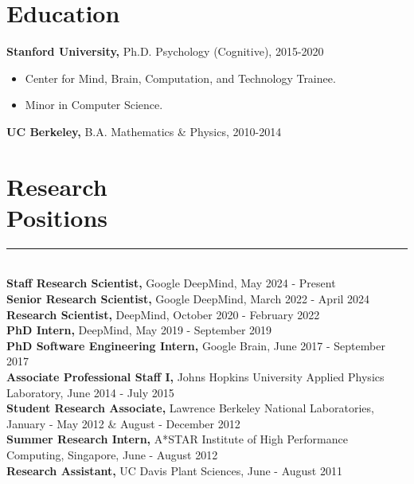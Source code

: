 \documentclass[margin]{res}
\begin{document}
 
 
 
\address{{\bf Email} \\ andrewlampinen@gmail.com}
\address{{\bf Website} \\\url{https://lampinen.github.io}}
\begin{resume} 
\section{Education} 
{\bf Stanford University,} Ph.D. Psychology (Cognitive), 2015-2020
\begin{itemize} \itemsep -2pt \item Center for Mind, Brain, Computation, and Technology Trainee. \item Minor in Computer Science.\end{itemize}
{\bf UC Berkeley,}  B.A. Mathematics \& Physics, 2010-2014%
\vspace{1pt}\section{Research\\Positions} \vspace{-15pt} \rule{\textwidth}{0.5pt} \\[3pt]
{\bf Staff Research Scientist,} Google DeepMind, May 2024 - Present\\[0.1em] 
{\bf Senior Research Scientist,} Google DeepMind, March 2022 - April 2024\\[0.1em] 
{\bf Research Scientist,} DeepMind, October 2020 - February 2022\\[0.1em]
{\bf PhD Intern,} DeepMind, May 2019 - September 2019\\[0.1em]
{\bf PhD Software Engineering Intern,} Google Brain, June 2017 - September 2017\\[0.1em]
{\bf Associate Professional Staff I,} Johns Hopkins University Applied Physics Laboratory, June 2014 - July 2015\\[0.1em] 
{\bf Student Research Associate,} Lawrence Berkeley National Laboratories, January - May 2012 \& August - December 2012\\[0.1em]
{\bf Summer Research Intern,} A*STAR Institute of High Performance Computing, Singapore, June - August 2012\\[0.1em]
{\bf Research Assistant,} UC Davis Plant Sciences, June - August 2011
\vspace{1pt}

\end{resume}
\end{document}
